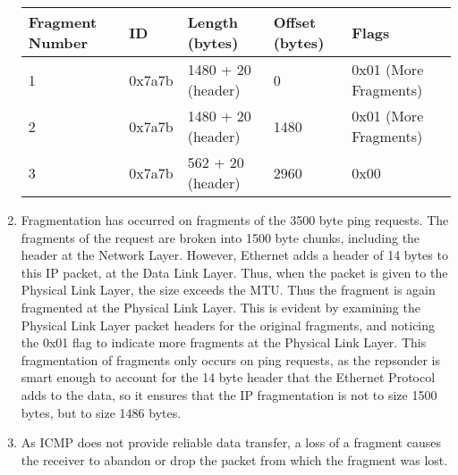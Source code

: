 \documentclass[a4paper,11pt]{article}
\begin{document}
\begin{enumerate}[leftmargin=*]
		\begin{table}[!h]
		\centering
		\begin{tabular}{@{}|l|l|l|l|l|@{}}
		\toprule
		Fragment Number & ID 		& Length (bytes) 		& Offset (bytes) 	& Flags       				\\ \midrule
		1 				& 0x7a7b	& 1480 + 20 (header) 	& 0					& 0x01 (More Fragments) 	\\ 
		2 				& 0x7a7b	& 1480 + 20 (header) 	& 1480				& 0x01 (More Fragments) 	\\ 
		3 				& 0x7a7b	& 562 + 20 (header) 	& 2960				& 0x00 						\\ \bottomrule
		\end{tabular}
		\end{table}
	\item Fragmentation has occurred on fragments of the 3500 byte ping requests. The fragments of the request are broken into 1500 byte chunks, including the header at the Network Layer. However, Ethernet adds a header of 14 bytes to this IP packet, at the Data Link Layer. Thus, when the packet is given to the Physical Link Layer, the size exceeds the MTU. Thus the fragment is again fragmented at the Physical Link Layer. This is evident by examining the Physical Link Layer packet headers for the original fragments, and noticing the 0x01 flag to indicate more fragments at the Physical Link Layer. This fragmentation of fragments only occurs on ping requests, as the repsonder is smart enough to account for the 14 byte header that the Ethernet Protocol adds to the data, so it ensures that the IP fragmentation is not to size 1500 bytes, but to size 1486 bytes.
	\item As ICMP does not provide reliable data transfer, a loss of a fragment causes the receiver to abandon or drop the packet from which the fragment was lost.
\end{enumerate}
\end{document}
